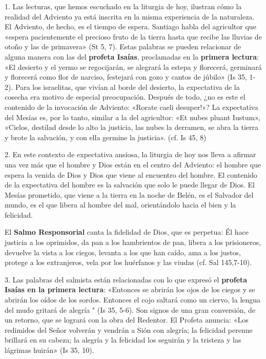 \documentclass[]{article}
\begin{document}
1. Las lecturas, que hemos escuchado en la liturgia de hoy, ilustran
cómo la realidad del Adviento ya está inscrita en la misma experiencia
de la naturaleza. El Adviento, de hecho, es el tiempo de espera.
Santiago habla del agricultor que «espera pacientemente el precioso
fruto de la tierra hasta que recibe las lluvias de otoño y las de
primavera» (St 5, 7). Estas palabras se pueden relacionar de alguna
manera con las del \textbf{profeta Isaías}, proclamadas en la
\textbf{primera lectura}: «El desierto y el yermo se regocijarán, se
alegrará la estepa y florecerá, germinará y florecerá como flor de
narciso, festejará con gozo y cantos de júbilo» (Is 35, 1-2). Para los
israelitas, que vivían al borde del desierto, la expectativa de la
cosecha era motivo de especial preocupación. Después de todo, ¿no es
este el contenido de la invocación de Adviento: «Rorate caeli desuper!»?
La expectativa del Mesías es, por lo tanto, similar a la del agricultor:
«Et nubes pluant Iustum», «Cielos, destilad desde lo alto la justicia,
las nubes la derramen, se abra la tierra y brote la salvación, y con
ella germine la justicia». (cf. Is 45, 8)

2. En este contexto de expectativa ansiosa, la liturgia de hoy nos lleva
a afirmar una vez más que el hombre y Dios están en el centro del
Adviento: el hombre que espera la venida de Dios y Dios que viene al
encuentro del hombre. El contenido de la expectativa del hombre es la
salvación que solo le puede llegar de Dios. El Mesías prometido, que
viene a la tierra en la noche de Belén, es el Salvador del mundo, es el
que libera al hombre del mal, orientándolo hacia el bien y la felicidad.

El \textbf{Salmo Responsorial} canta la fidelidad de Dios, que es
perpetua: Él hace justicia a los oprimidos, da pan a los hambrientos de
pan, libera a los prisioneros, devuelve la vista a los ciegos, levanta a
los que han caído, ama a los justos, protege a los extranjeros, vela por
los huérfanos y las viudas (cf. Sal 145,7-10).

3. Las palabras del salmista están relacionadas con lo que expresó el
\textbf{profeta Isaías en la primera lectura}: «Entonces se abrirán los
ojos de los ciegos y se abrirán los oídos de los sordos. Entonces el
cojo saltará como un ciervo, la lengua del mudo gritará de alegría " (Is
35, 5-6). Son signos de una gran conversión, de un retorno, que se
logrará con la obra del Redentor. El Profeta anuncia: «Los redimidos del
Señor volverán y vendrán a Sión con alegría; la felicidad perenne
brillará en su cabeza; la alegría y la felicidad los seguirán y la
tristeza y las lágrimas huirán» (Is 35, 10).
\end{document}
